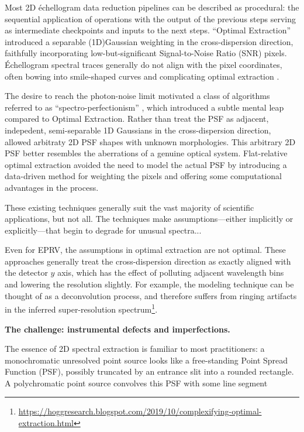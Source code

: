 \documentclass[twocolumn]{aastex63}
\begin{document}
Most 2D \'echellogram data reduction pipelines can be described as procedural: the sequential application of operations with the output of the previous steps serving as intermediate checkpoints and inputs to the next steps.  ``Optimal Extraction'' \citep{1986PASP...98..609H} introduced a separable (1D)Gaussian weighting in the cross-dispersion direction, faithfully incorporating low-but-significant Signal-to-Noise Ratio (SNR) pixels.  \'Echellogram spectral traces generally do not align with the pixel coordinates, often bowing into smile-shaped curves and complicating optimal extraction \citep{2002A&A...385.1095P,2020arXiv200805827P}.

The desire to reach the photon-noise limit motivated a class of algorithms referred to as ``spectro-perfectionism'' \citep{2010PASP..122..248B}, which introduced a subtle mental leap compared to Optimal Extraction.  Rather than treat the PSF as adjacent, indepedent, semi-separable 1D Gaussians in the cross-dispersion direction, \citet{2010PASP..122..248B} allowed arbitraty 2D PSF shapes with unknown morphologies. This arbitrary 2D PSF better resembles the aberrations of a genuine optical system.  Flat-relative optimal extraction \citep{2014A&A...561A..59Z} avoided the need to model the actual PSF by introducing a data-driven method for weighting the pixels and offering some computational advantages in the process.

These existing techniques generally suit the vast majority of scientific applications, but not all.  The techniques make assumptions---either implicitly or explicitly---that begin to degrade for unusual spectra...

Even for EPRV, the assumptions in optimal extraction are not optimal.  These approaches generally treat the cross-dispersion direction as exactly aligned with the detector $y$ axis, which has the effect of polluting adjacent wavelength bins and lowering the resolution slightly.  For example, the \citet{2010PASP..122..248B} modeling technique can be thought of as a deconvolution process, and therefore suffers from ringing artifacts in the inferred super-resolution spectrum\footnote{\url{https://hoggresearch.blogspot.com/2019/10/complexifying-optimal-extraction.html}}.


\textbf{The challenge: instrumental defects and imperfections.}

The essence of 2D spectral extraction is familiar to most practitioners: a monochromatic unresolved point source looks like a free-standing Point Spread Function (PSF), possibly truncated by an entrance slit into a rounded rectangle.  A polychromatic point source convolves this PSF with some line segment
\end{document}
